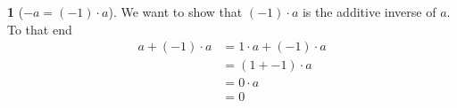 \documentclass[12pt]{article}
\theoremstyle{definition}
\newtheorem{theorem}{\color{ForestGreen}{\textbf{Theorem}}}
\begin{document}
\begin{theorem}[$-a = (-1)\cdot a$]
We want to show that $(-1)\cdot a$ is the additive inverse of $a$. To that end
\begin{align*}
a + (-1)\cdot a &= 1 \cdot a + (-1) \cdot a \tag{$1$ multiplicative identity}\\
&= (1 + -1) \cdot a \tag{distributivity}\\
&= 0 \cdot a \\
&= 0
\end{align*}
\end{theorem}
\end{document}
